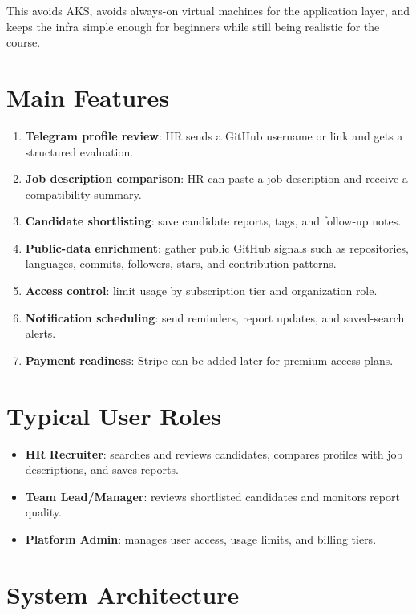 \documentclass[11pt]{article}
\begin{document}
This avoids AKS, avoids always-on virtual machines for the application layer, and keeps the infra simple enough for beginners while still being realistic for the course.

\section{Main Features}
\begin{enumerate}[leftmargin=*]
  \item \textbf{Telegram profile review}: HR sends a GitHub username or link and gets a structured evaluation.
  \item \textbf{Job description comparison}: HR can paste a job description and receive a compatibility summary.
  \item \textbf{Candidate shortlisting}: save candidate reports, tags, and follow-up notes.
  \item \textbf{Public-data enrichment}: gather public GitHub signals such as repositories, languages, commits, followers, stars, and contribution patterns.
  \item \textbf{Access control}: limit usage by subscription tier and organization role.
  \item \textbf{Notification scheduling}: send reminders, report updates, and saved-search alerts.
  \item \textbf{Payment readiness}: Stripe can be added later for premium access plans.
\end{enumerate}

\section{Typical User Roles}
\begin{itemize}[leftmargin=*]
  \item \textbf{HR Recruiter}: searches and reviews candidates, compares profiles with job descriptions, and saves reports.
  \item \textbf{Team Lead/Manager}: reviews shortlisted candidates and monitors report quality.
  \item \textbf{Platform Admin}: manages user access, usage limits, and billing tiers.
\end{itemize}

\section{System Architecture}
\end{document}
